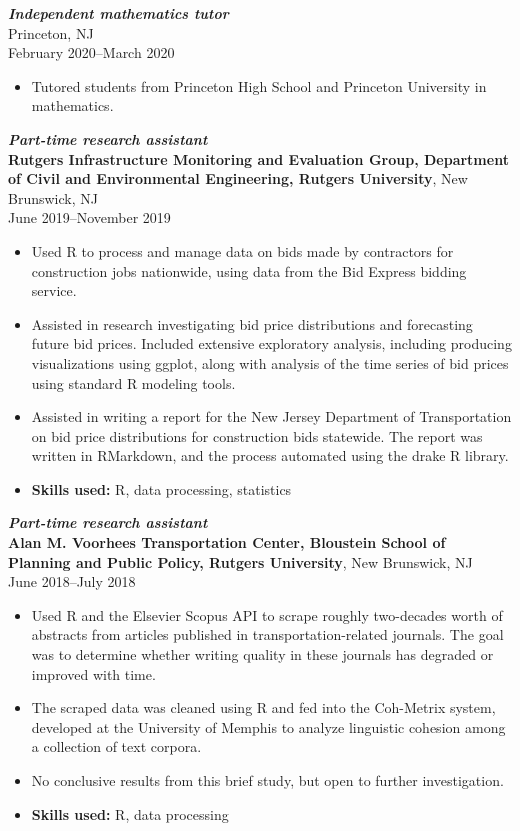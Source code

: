 \documentclass[letterpaper,12pt]{article}
\begin{document}
\textit{\textbf{Independent mathematics tutor}} \\
Princeton, NJ \\
February 2020--March 2020
\begin{itemize}
\item Tutored students from Princeton High School and Princeton
  University in mathematics.
\end{itemize}
\fi

\textit{\textbf{Part-time research assistant}} \\
\textbf{Rutgers Infrastructure Monitoring and Evaluation Group,
  Department of Civil and Environmental Engineering, Rutgers
  University},
New Brunswick, NJ \\
June 2019--November 2019
\begin{itemize}
\item Used R to process and manage data on bids made by contractors
  for construction jobs nationwide, using data from the Bid Express
  bidding service.
\item Assisted in research investigating bid price distributions and
  forecasting future bid prices. Included extensive exploratory
  analysis, including producing visualizations using ggplot, along
  with analysis of the time series of bid prices using standard R
  modeling tools.
\item Assisted in writing a report for the New Jersey Department of
  Transportation on bid price distributions for construction bids
  statewide. The report was written in RMarkdown, and the process
  automated using the drake R library.
\item \textbf{Skills used:} R, data processing, statistics
\end{itemize}

\textit{\textbf{Part-time research assistant}} \\
\textbf{Alan M. Voorhees Transportation Center, Bloustein School of
  Planning and Public Policy, Rutgers University},
New Brunswick, NJ \\
June 2018--July 2018
\begin{itemize}
\item Used R and the Elsevier Scopus API to scrape roughly two-decades
  worth of abstracts from articles published in transportation-related
  journals. The goal was to determine whether writing quality in these
  journals has degraded or improved with time.
\item The scraped data was cleaned using R and fed into the Coh-Metrix
  system, developed at the University of Memphis to analyze linguistic
  cohesion among a collection of text corpora.
\item No conclusive results from this brief study, but open to further
  investigation.
\item \textbf{Skills used:} R, data processing
\end{itemize}
\end{document}
